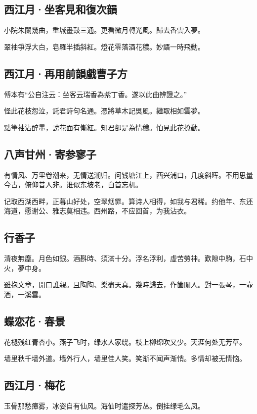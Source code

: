 \documentclass[a5paper]{ctexart}
\begin{document}
	\subsection{西江月·坐客見和復次韻}
	小院朱闌幾曲，重城畫鼓三通。更看微月轉光風。歸去香雲入夢。
	
	翠袖爭浮大白，皂羅半插斜紅。燈花零落酒花穠。妙語一時飛動。
	
	\subsection{西江月·再用前韻戲曹子方}
	\begin{small}
		傅本有“公自注云：坐客云瑞香為紫丁香。遂以此曲辨證之。”
	\end{small}
	
	怪此花枝怨泣，託君詩句名通。憑將草木記吳風。繼取相如雲夢。
	
	點筆袖沾醉墨，謗花面有慚紅。知君卻是為情穠。怕見此花撩動。
	
	\subsection{八声甘州·寄参寥子}
	有情风、万里卷潮来，无情送潮归。问钱塘江上，西兴浦口，几度斜晖。不用思量今古，俯仰昔人非。谁似东坡老，白首忘机。
	
	记取西湖西畔，正暮山好处，空翠烟霏。算诗人相得，如我与君稀。约他年、东还海道，愿谢公、雅志莫相违。西州路，不应回首，为我沾衣。
	
	\subsection{行香子}
	清夜無塵。月色如銀。酒斟時、須滿十分。浮名浮利，虛苦勞神。歎隙中駒，石中火，夢中身。
	
	雖抱文章，開口誰親。且陶陶、樂盡天真。幾時歸去，作箇閒人。對一張琴，一壺酒，一溪雲。
	
	\subsection{蝶恋花·春景}
	花褪残红青杏小。燕子飞时，绿水人家绕。枝上柳绵吹又少。天涯何处无芳草。
	
	墙里秋千墙外道。墙外行人，墙里佳人笑。笑渐不闻声渐悄。多情却被无情恼。
	
	\subsection{西江月·梅花}
	玉骨那愁瘴雾，冰姿自有仙风。海仙时遣探芳丛。倒挂绿毛么凤。
	
\end{document}
